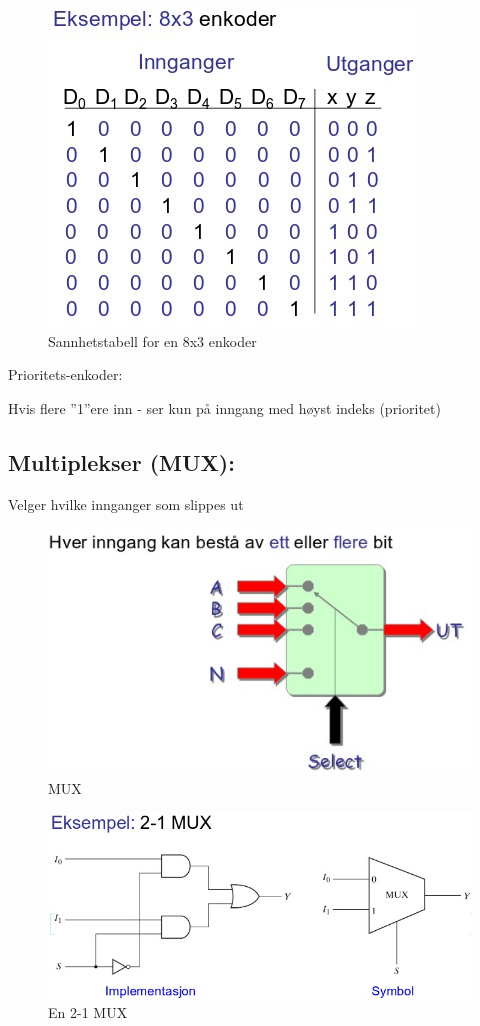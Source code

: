 \documentclass{article}
\begin{document}
	\begin{figure}[H]
		\includegraphics[scale = 0.6]{enkoder.jpg}
		\caption{Sannhetstabell for en 8x3 enkoder}
	\end{figure}
	
	Prioritets-enkoder:
	
	Hvis flere ”1”ere inn - ser kun på inngang med høyst indeks (prioritet) 
	
	
	\subsection*{Multiplekser (MUX):}
	Velger hvilke  innganger som slippes ut
	
	\begin{figure}[H]
		\includegraphics[scale = 0.6]{MUX.jpg}
		\caption{MUX}
	\end{figure}
	
	\begin{figure}[H]
		\includegraphics[scale = 0.6]{MUX2.jpg}
		\caption{En 2-1 MUX}
	\end{figure}
	
\end{document}

